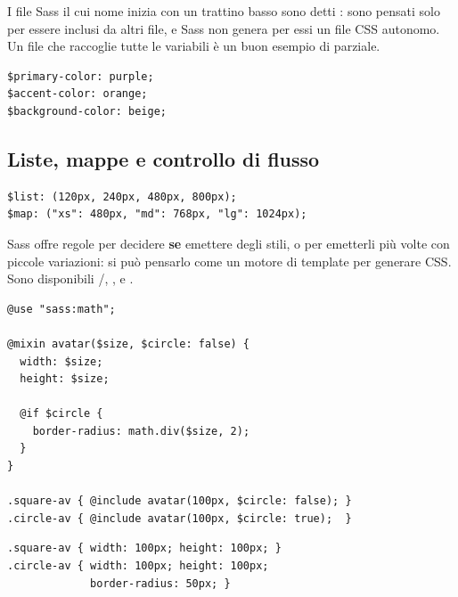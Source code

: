 I file Sass il cui nome inizia con un trattino basso sono detti :
sono pensati solo per essere inclusi da altri file, e Sass non genera per essi
un file CSS autonomo. Un file che raccoglie tutte le variabili è un buon esempio
di parziale.

\begin{lstlisting}[style=css, name=_variables.scss]
$primary-color: purple;
$accent-color: orange;
$background-color: beige;
\end{lstlisting}

\subsection{Liste, mappe e controllo di flusso}

\begin{lstlisting}[style=css]
$list: (120px, 240px, 480px, 800px);
$map: ("xs": 480px, "md": 768px, "lg": 1024px);
\end{lstlisting}

Sass offre regole per decidere \textbf{se} emettere degli stili, o per emetterli
più volte con piccole variazioni: si può pensarlo come un motore di template per
generare CSS. Sono disponibili /, ,
 e .

\begin{affianco}[0.55]
\begin{lstlisting}[style=css, name=avatar.scss]
@use "sass:math";

@mixin avatar($size, $circle: false) {
  width: $size;
  height: $size;

  @if $circle {
    border-radius: math.div($size, 2);
  }
}

.square-av { @include avatar(100px, $circle: false); }
.circle-av { @include avatar(100px, $circle: true);  }
\end{lstlisting}
\risultato
\begin{lstlisting}[style=css, name=CSS generato]
.square-av { width: 100px; height: 100px; }
.circle-av { width: 100px; height: 100px;
             border-radius: 50px; }
\end{lstlisting}
\begin{browser}[avatar]
\end{browser}
\end{affianco}

